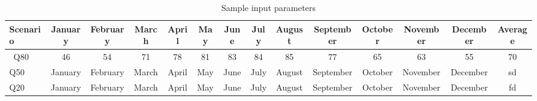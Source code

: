 \begin{table}
\label{tab:Sampleworkability}
\begin{tabular}{lccccccccccccc}
\hline 
Scenario & January & February & March & April  & May & June & July & August & September & October & November & December & Average \\
\hline \
Q80 & 46 & 54 & 71 & 78  & 81 & 83 & 84 & 85 & 77 & 65 & 63 & 55 & 70\\
Q50 & January & February & March & April  & May & June & July & August & September & October & November & December & sd\\
Q20 & January & February & March & April  & May & June & July & August & September & October & November & December & fd  \\
\hline 
\end{tabular}
\caption{Sample input parameters }
\end{table}